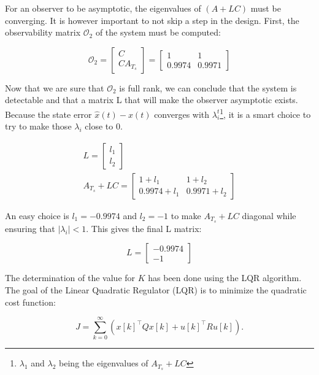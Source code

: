 For an observer to be asymptotic, the eigenvalues of $(A + LC)$ must be converging. It is however important to not skip
a step in the design. First, the observability matrix $\mathcal{O}_2$ of the system must be computed:

\begin{equation}
    \mathcal{O}_2 = 
    \begin{bmatrix}
        C\\
        C A_{T_s}
    \end{bmatrix}
    =
    \begin{bmatrix}
        1 & 1\\
        0.9974 & 0.9971
    \end{bmatrix}
\end{equation}

Now that we are sure that $\mathcal{O}_2$ is full rank, we can conclude that the system is detectable and that a matrix
L that will make the observer asymptotic exists. Because the state error $\hat{x}(t) - x(t)$ converges with 
$\lambda_i^t$\footnote{$\lambda_1$ and $\lambda_2$ being the eigenvalues of $A_{T_s} + LC$}, it is a smart choice to try to make
those $\lambda_i$ close to 0.

\begin{gather}
    L = \begin{bmatrix} l_1\\l_2 \end{bmatrix}\\
    A_{T_s} + L C = \begin{bmatrix} 1+l_1 & 1+l_2 \\ 0.9974+l_1 & 0.9971+l_2 \end{bmatrix}
\end{gather}

An easy choice is $l_1 = -0.9974$ and $l_2 = -1$ to make $A_{T_s} + LC$ diagonal while ensuring that $\left|\lambda_i
\right| < 1$. This gives the final L matrix:

\begin{equation}
    L = \begin{bmatrix}
        -0.9974 \\ -1
    \end{bmatrix}
\end{equation}
\fi


The determination of the value for $K$ has been done using the LQR algorithm. The goal of the Linear Quadratic Regulator (LQR) is to minimize the quadratic cost function:

\[
J = \sum_{k=0}^\infty \left( x[k]^\top Q x[k] + u[k]^\top R u[k] \right).
\]

